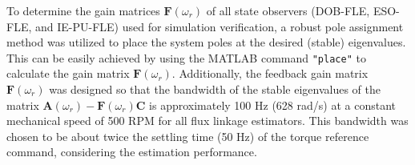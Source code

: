 To determine the gain matrices ${{\boldsymbol{F}({\omega}_{r})}}$ of all state observers (DOB-FLE, ESO-FLE, and IE-PU-FLE) used for simulation verification, a robust pole assignment method \cite{c3.2_3} was utilized to place the system poles at the desired (stable) eigenvalues. This can be easily achieved by using the MATLAB command \texttt{"place"} to calculate the gain matrix ${{\boldsymbol{F}({\omega}_{r})}}$. Additionally, the feedback gain matrix ${{\boldsymbol{F}({\omega}_{r})}}$ was designed so that the bandwidth of the stable eigenvalues of the matrix ${{\boldsymbol{A}}({\omega}_{r})} - {{\boldsymbol{F}({\omega}_{r})}} {{\boldsymbol{C}}}$ is approximately 100 Hz (628 rad/s) at a constant mechanical speed of 500 RPM for all flux linkage estimators. This bandwidth was chosen to be about twice the settling time (50 Hz) of the torque reference command, considering the estimation performance.

